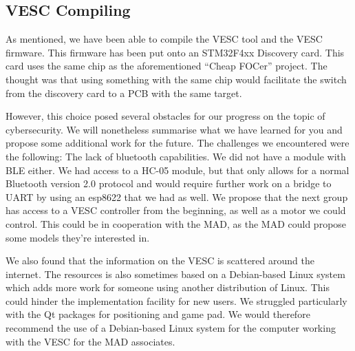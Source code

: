 \subsection{VESC Compiling}
As mentioned, we have been able to compile the VESC tool and the VESC firmware. This firmware has been put onto an STM32F4xx Discovery card. This card uses the same chip as the aforementioned ``Cheap FOCer'' project. The thought was that using something with the same chip would facilitate the switch from the discovery card to a PCB with the same target.

However, this choice posed several obstacles for our progress on the topic of cybersecurity. We will nonetheless summarise what we have learned for you and propose some additional work for the future. The challenges we encountered were the following: The lack of bluetooth capabilities. We did not have a module with BLE either. We had access to a HC-05 module, but that only allows for a normal Bluetooth version 2.0 protocol and would require further work on a bridge to UART by using an esp8622 that we had as well. We propose that the next group has access to a VESC controller from the beginning, as well as a motor we could control. This could be in cooperation with the MAD, as the MAD could propose some models they're interested in.

We also found that the information on the VESC is scattered around the internet. The resources is also sometimes based on a Debian-based Linux system which adds more work for someone using another distribution of Linux. This could hinder the implementation facility for new users. We struggled particularly with the Qt packages for positioning and game pad. We would therefore recommend the use of a Debian-based Linux system for the computer working with the VESC for the MAD associates.




